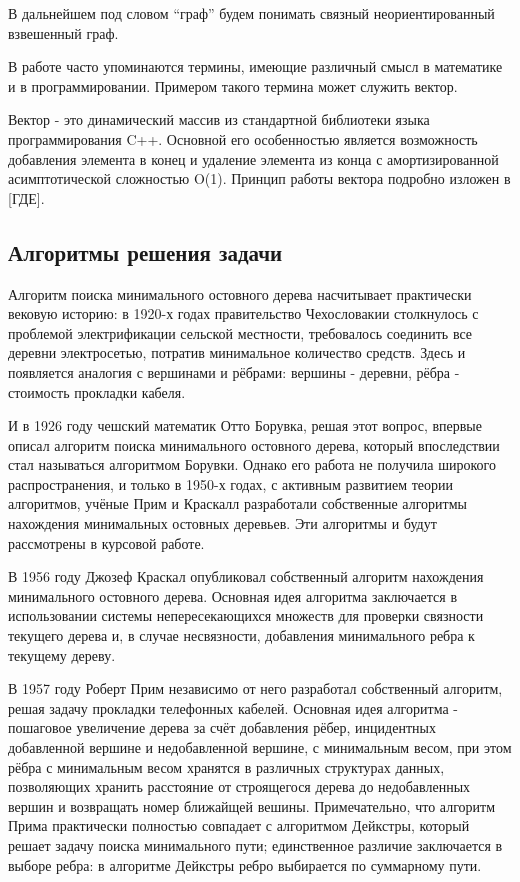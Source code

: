	В дальнейшем под словом ``граф'' будем понимать связный неориентированный взвешенный граф.
	
	В работе часто упоминаются термины, имеющие различный смысл в математике и в программировании. Примером такого термина может служить вектор.
	
	Вектор - это динамический массив из стандартной библиотеки языка программирования C++. Основной его особенностью является возможность добавления элемента в конец и удаление элемента из конца с амортизированной асимптотической сложностью O(1). Принцип работы вектора подробно изложен в [ГДЕ].
	
	\subsection{Алгоритмы решения задачи}
	\hspace{0.5 cm}Алгоритм поиска минимального остовного дерева насчитывает практически вековую историю: в 1920-х годах правительство Чехословакии столкнулось с проблемой электрификации сельской местности, требовалось соединить все деревни электросетью, потратив минимальное количество средств. Здесь и появляется аналогия с вершинами и рёбрами: вершины - деревни, рёбра - стоимость прокладки кабеля.
	
	И в 1926 году чешский математик Отто Борувка, решая этот вопрос, впервые описал алгоритм поиска минимального остовного дерева, который впоследствии стал называться алгоритмом Борувки. Однако его работа не получила широкого распространения, и только в 1950-х годах, с активным развитием теории алгоритмов, учёные Прим и Краскалл разработали собственные алгоритмы нахождения минимальных остовных деревьев. Эти алгоритмы и будут рассмотрены в курсовой работе.
	
	В 1956 году Джозеф Краскал опубликовал собственный алгоритм нахождения минимального остовного дерева. Основная идея алгоритма заключается в использовании системы непересекающихся множеств для проверки связности текущего дерева и, в случае несвязности, добавления минимального ребра к текущему дереву.
	
	В 1957 году Роберт Прим независимо от него разработал собственный алгоритм, решая задачу прокладки телефонных кабелей. Основная идея алгоритма - пошаговое увеличение дерева за счёт добавления рёбер, инцидентных добавленной вершине и недобавленной вершине, с минимальным весом, при этом рёбра с минимальным весом хранятся в различных структурах данных, позволяющих хранить расстояние от строящегося дерева до недобавленных вершин и возвращать номер ближайщей вешины. Примечательно, что алгоритм Прима практически полностью совпадает с алгоритмом Дейкстры, который решает задачу поиска минимального пути; единственное различие заключается в выборе ребра: в алгоритме Дейкстры ребро выбирается по суммарному пути.
	
